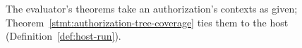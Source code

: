The evaluator's theorems take an authorization's contexts as given;
Theorem~\ref{stmt:authorization-tree-coverage} ties them to the host
(Definition~\ref{def:host-run}).


